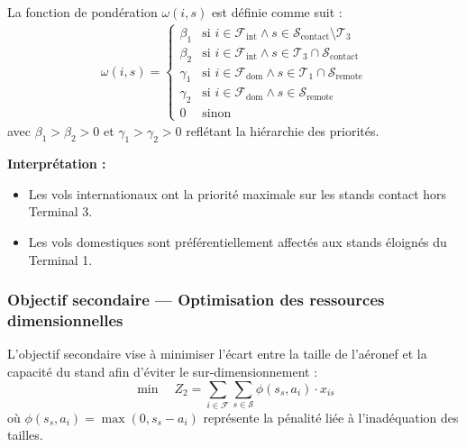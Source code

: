 \noindent La fonction de pondération $\omega(i,s)$ est définie comme suit :
\begin{align*}
	\omega(i,s) = 
	\begin{cases}
		\beta_1 & \text{si } i \in \mathcal{F}_{\text{int}} \land s \in \mathcal{S}_{\text{contact}} \setminus \mathcal{T}_3 \\
		\beta_2 & \text{si } i \in \mathcal{F}_{\text{int}} \land s \in \mathcal{T}_3 \cap \mathcal{S}_{\text{contact}} \\
		\gamma_1 & \text{si } i \in \mathcal{F}_{\text{dom}} \land s \in \mathcal{T}_1 \cap \mathcal{S}_{\text{remote}} \\
		\gamma_2 & \text{si } i \in \mathcal{F}_{\text{dom}} \land s \in \mathcal{S}_{\text{remote}} \\
		0 & \text{sinon}
	\end{cases}
\end{align*}
avec $\beta_1 > \beta_2 > 0$ et $\gamma_1 > \gamma_2 > 0$ reflétant la hiérarchie des priorités.

\vspace{0.5em}
\noindent\textbf{Interprétation :}
\begin{itemize}[leftmargin=1.7em]
	\item Les vols internationaux ont la priorité maximale sur les stands contact hors Terminal 3.
	\item Les vols domestiques sont préférentiellement affectés aux stands éloignés du Terminal 1.
\end{itemize}

\subsubsection{Objectif secondaire — Optimisation des ressources dimensionnelles}
\label{sssec:secondary_objective}

\begin{objective}
	
	L’objectif secondaire vise à minimiser l’écart entre la taille de l’aéronef et la capacité du stand afin d’éviter le sur-dimensionnement :
\vspace{-0.7em}
	\begin{equation}
		\boxed{
			\min \quad Z_2 = \sum_{i \in \mathcal{F}} \sum_{s \in \mathcal{S}} \phi(s_s, a_i) \cdot x_{is}
		}
		\label{eq:eq3}
	\end{equation}
	où $\phi(s_s, a_i) = \max(0, s_s - a_i)$ représente la pénalité liée à l’inadéquation des tailles.
\end{objective}

